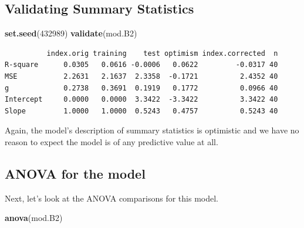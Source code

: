 \documentclass[]{book}
\newenvironment{Shaded}{\begin{snugshade}}{\end{snugshade}}
\newcommand{\KeywordTok}[1]{\textcolor[rgb]{0.13,0.29,0.53}{\textbf{#1}}}
\newcommand{\DecValTok}[1]{\textcolor[rgb]{0.00,0.00,0.81}{#1}}
\newcommand{\NormalTok}[1]{#1}
\theoremstyle{definition}
\theoremstyle{definition}
\theoremstyle{definition}
\theoremstyle{remark}
\begin{document}
\subsection{Validating Summary
Statistics}\label{validating-summary-statistics-3}

\begin{Shaded}
\begin{Highlighting}[]
\KeywordTok{set.seed}\NormalTok{(}\DecValTok{432989}\NormalTok{)}
\KeywordTok{validate}\NormalTok{(mod.B2)}
\end{Highlighting}
\end{Shaded}

\begin{verbatim}
          index.orig training    test optimism index.corrected  n
R-square      0.0305   0.0616 -0.0006   0.0622         -0.0317 40
MSE           2.2631   2.1637  2.3358  -0.1721          2.4352 40
g             0.2738   0.3691  0.1919   0.1772          0.0966 40
Intercept     0.0000   0.0000  3.3422  -3.3422          3.3422 40
Slope         1.0000   1.0000  0.5243   0.4757          0.5243 40
\end{verbatim}

Again, the model's description of summary statistics is optimistic and
we have no reason to expect the model is of any predictive value at all.

\subsection{ANOVA for the model}\label{anova-for-the-model-3}

Next, let's look at the ANOVA comparisons for this model.

\begin{Shaded}
\begin{Highlighting}[]
\KeywordTok{anova}\NormalTok{(mod.B2)}
\end{Highlighting}
\end{Shaded}
\end{document}
